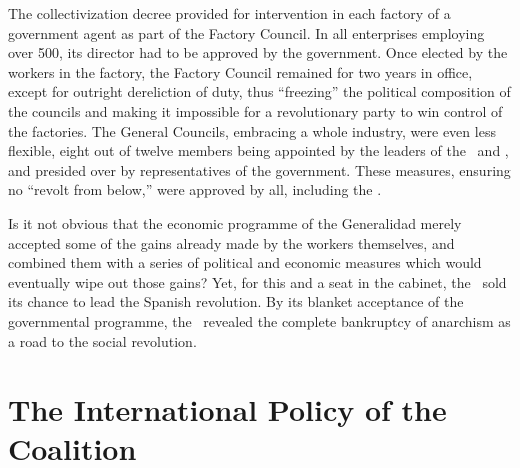 The collectivization decree provided for intervention in each factory of a government agent as part of the Factory Council. In all enterprises employing over 500, its director had to be approved by the government. Once elected by the workers in the factory, the Factory Council remained for two years in office, except for outright dereliction of duty, thus ``freezing'' the political composition of the councils and making it impossible for a revolutionary party to win control of the factories. The General Councils, embracing a whole industry, were even less flexible, eight out of twelve members being appointed by the leaders of the \UGT\ and \CNT, and presided over by representatives of the government. These measures, ensuring no ``revolt from below,'' were approved by all, including the \POUM.

Is it not obvious that the economic programme of the Generalidad merely accepted some of the gains already made by the workers themselves, and combined them with a series of political and economic measures which would eventually wipe out those gains? Yet, for this and a seat in the cabinet, the \POUM\ sold its chance to lead the Spanish revolution. By its blanket acceptance of the governmental programme, the \CNT\ revealed the complete bankruptcy of anarchism as a road to the social revolution.

\section{The International Policy of the Coalition}

